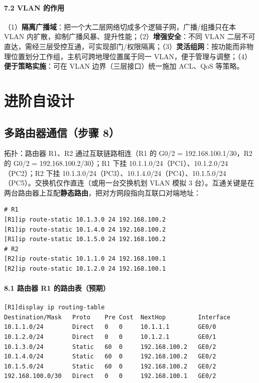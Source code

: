 \documentclass[12pt,a4paper]{article}
\begin{document}
\paragraph{7.2 VLAN 的作用}
（1）\textbf{隔离广播域}：把一个大二层网络切成多个逻辑子网，广播/组播只在本 VLAN 内扩散，抑制广播风暴、提升性能；（2）\textbf{增强安全}：不同 VLAN 二层不可直达，需经三层受控互通，可实现部门/权限隔离；（3）\textbf{灵活组网}：按功能而非物理位置划分工作组，主机可跨地理位置属于同一 VLAN，便于管理与调整；（4）\textbf{便于策略实施}：可在 VLAN 边界（三层接口）统一施加 ACL、QoS 等策略。

\section{进阶自设计}

\subsection{多路由器通信（步骤 8）}
拓扑：路由器 R1、R2 通过互联链路相连（R1 的 G0/2 = 192.168.100.1/30，R2 的 G0/2 = 192.168.100.2/30）；R1 下挂 10.1.1.0/24（PC1）、10.1.2.0/24（PC2）；R2 下挂 10.1.3.0/24（PC3）、10.1.4.0/24（PC4）、10.1.5.0/24（PC5）。交换机仅作直连（或用一台交换机划 VLAN 模拟 3 台）。互通关键是在两台路由器上互配\textbf{静态路由}，把对方网段指向互联口对端地址：
\begin{lstlisting}[style=cli]
# R1
[R1]ip route-static 10.1.3.0 24 192.168.100.2
[R1]ip route-static 10.1.4.0 24 192.168.100.2
[R1]ip route-static 10.1.5.0 24 192.168.100.2
# R2
[R2]ip route-static 10.1.1.0 24 192.168.100.1
[R2]ip route-static 10.1.2.0 24 192.168.100.1
\end{lstlisting}

\paragraph{8.1 路由器 R1 的路由表（预期）}
\begin{lstlisting}[style=cli]
[R1]display ip routing-table
Destination/Mask   Proto    Pre Cost  NextHop         Interface
10.1.1.0/24        Direct   0   0     10.1.1.1        GE0/0
10.1.2.0/24        Direct   0   0     10.1.2.1        GE0/1
10.1.3.0/24        Static   60  0     192.168.100.2   GE0/2
10.1.4.0/24        Static   60  0     192.168.100.2   GE0/2
10.1.5.0/24        Static   60  0     192.168.100.2   GE0/2
192.168.100.0/30   Direct   0   0     192.168.100.1   GE0/2
\end{lstlisting}
\end{document}
